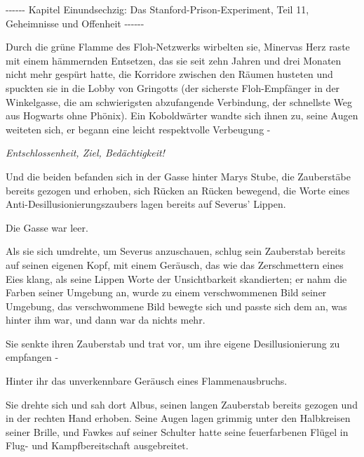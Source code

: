 

\hypertarget{das-stanford-prison-experiment-teil-11-geheimnisse-und-offenheit}{%

-\/-\/-\/-\/-\/- Kapitel Einundsechzig: Das Stanford-Prison-Experiment, Teil 11, Geheimnisse und Offenheit -\/-\/-\/-\/-\/-

Durch die grüne Flamme des Floh-Netzwerks wirbelten sie, Minervas Herz raste mit einem hämmernden Entsetzen, das sie seit zehn Jahren und drei Monaten nicht mehr gespürt hatte, die Korridore zwischen den Räumen husteten und spuckten sie in die Lobby von Gringotts (der sicherste Floh-Empfänger in der Winkelgasse, die am schwierigsten abzufangende Verbindung, der schnellste Weg aus Hogwarts ohne Phönix). Ein Koboldwärter wandte sich ihnen zu, seine Augen weiteten sich, er begann eine leicht respektvolle Verbeugung -

\emph{\emph{Entschlossenheit, Ziel,} \emph{Bedächtigkeit!}}

Und die beiden befanden sich in der Gasse hinter Marys Stube, die Zauberstäbe bereits gezogen und erhoben, sich Rücken an Rücken bewegend, die Worte eines Anti-Desillusionierungszaubers lagen bereits auf Severus' Lippen.

Die Gasse war leer.

Als sie sich umdrehte, um Severus anzuschauen, schlug sein Zauberstab bereits auf seinen eigenen Kopf, mit einem Geräusch, das wie das Zerschmettern eines Eies klang, als seine Lippen Worte der Unsichtbarkeit skandierten; er nahm die Farben seiner Umgebung an, wurde zu einem verschwommenen Bild seiner Umgebung, das verschwommene Bild bewegte sich und passte sich dem an, was hinter ihm war, und dann war da nichts mehr.

Sie senkte ihren Zauberstab und trat vor, um ihre eigene Desillusionierung zu empfangen -

Hinter ihr das unverkennbare Geräusch eines Flammenausbruchs.

Sie drehte sich und sah dort Albus, seinen langen Zauberstab bereits gezogen und in der rechten Hand erhoben. Seine Augen lagen grimmig unter den Halbkreisen seiner Brille, und Fawkes auf seiner Schulter hatte seine feuerfarbenen Flügel in Flug- und Kampfbereitschaft ausgebreitet.

}
